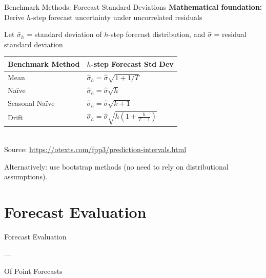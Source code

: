 \documentclass[11pt]{beamer}
\begin{document}
\begin{frame}[fragile]{Benchmark Methods: Forecast Standard Deviations}
	\textbf{Mathematical foundation:} Derive $h$-step forecast uncertainty under uncorrelated residuals

	\vspace{0.3cm}
	Let $\hat{\sigma}_h$ = standard deviation of $h$-step forecast distribution, and $\hat{\sigma}$ = residual standard deviation

	\vspace{0.5cm}
	\begin{table}
		\small
		\centering
		\begin{tabular}{ll}
			\toprule
			\textbf{Benchmark Method} & \textbf{$h$-step Forecast Std Dev} \\
			\midrule
			Mean & $\hat{\sigma}_h = \hat{\sigma}\sqrt{1 + 1/T}$ \\
			Naïve & $\hat{\sigma}_h = \hat{\sigma}\sqrt{h}$ \\
			Seasonal Naïve & $\hat{\sigma}_h = \hat{\sigma}\sqrt{k+1}$ \\
			Drift & $\hat{\sigma}_h = \hat{\sigma}\sqrt{h\left(1 + \frac{h}{T-1}\right)}$ \\
			\bottomrule
		\end{tabular}\\
		\footnotesize Source: \url{https://otexts.com/fpp3/prediction-intervals.html}
	\end{table}

	\vspace{0.3cm}
	Alternatively: use bootstrap methods (no need to rely on distributional assumptions).

%
\end{frame}


\section{Forecast Evaluation}

\begin{frame}
	\begin{center}
		\Large
		Forecast Evaluation

		---

		Of Point Forecasts
	\end{center}
\end{frame}
\end{document}
